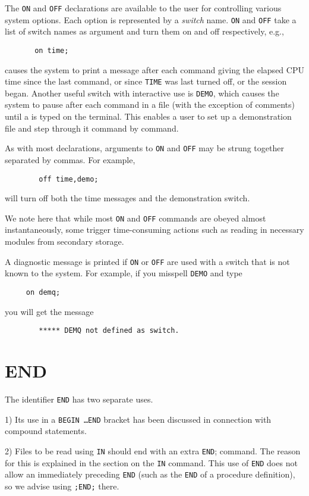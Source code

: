 The {\tt ON} and {\tt OFF} declarations are
available to the user for controlling various system options.  Each option
is represented by a {\em switch\/} name. {\tt ON} and {\tt OFF}
take a list of switch names as argument and turn them on and off
respectively, e.g.,
\begin{verbatim}
       on time;
\end{verbatim}
causes the system to print a message after each command giving the elapsed
CPU time since the last command, or since {\tt TIME} was
last turned off, or the session began.  Another useful switch with
interactive use is {\tt DEMO}, which causes the system to
pause after each command in a file (with the exception of comments)
until a  is typed on the terminal.  This
enables a user to set up a demonstration file and step through it command
by command.

As with most declarations, arguments to {\tt ON} and {\tt OFF} may be
strung together separated by commas.  For example,
\begin{verbatim}
        off time,demo;
\end{verbatim}
will turn off both the time messages and the demonstration switch.

We note here that while most {\tt ON} and {\tt OFF} commands are obeyed
almost instantaneously, some trigger time-consuming actions such as
reading in necessary modules from secondary storage.

A diagnostic message is printed if {\tt ON} or {\tt OFF}
 are used with a switch that is not known to the system.  For
example, if you misspell {\tt DEMO} and type
\begin{verbatim}
     on demq;
\end{verbatim}
you will get the message
\begin{verbatim}
        ***** DEMQ not defined as switch.
\end{verbatim}

\section{END}

The identifier {\tt END} has two separate uses.

1) Its use in a {\tt BEGIN \ldots END} bracket has been discussed in
connection with compound statements.

2) Files to be read using {\tt IN} should end with an extra {\tt END};
command.  The reason for this is explained in the section on the {\tt IN}
command.  This use of {\tt END} does not allow an immediately
preceding {\tt END} (such as the {\tt END} of a procedure definition), so
we advise using {\tt ;END;} there.

